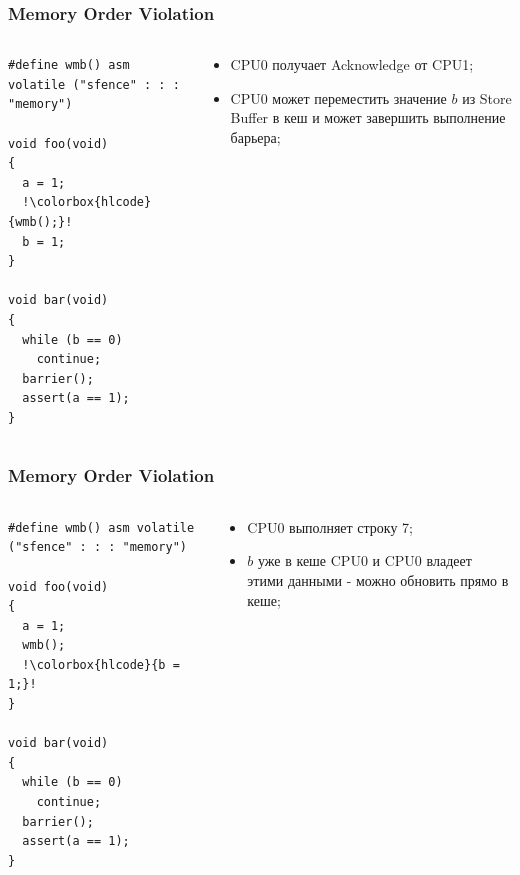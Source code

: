 \begin{frame}[fragile]
\frametitle{Memory Order Violation}

\begin{columns}[T]
  \begin{column}{.4\linewidth}
    \begin{lstlisting}[escapechar=!]
#define wmb() asm volatile ("sfence" : : : "memory")

void foo(void)
{
  a = 1;
  !\colorbox{hlcode}{wmb();}!
  b = 1;
}

void bar(void)
{
  while (b == 0)
    continue;
  barrier();
  assert(a == 1);
}
    \end{lstlisting}
  \end{column}
  \begin{column}{.6\linewidth}
    \begin{itemize}
      \item CPU0 получает Acknowledge от CPU1;
      \item CPU0 может переместить значение $b$ из Store Buffer в кеш и может
            завершить выполнение барьера;
    \end{itemize}
  \end{column}
\end{columns}
\end{frame}

\begin{frame}[fragile]
\frametitle{Memory Order Violation}

\begin{columns}[T]
  \begin{column}{.4\linewidth}
    \begin{lstlisting}[escapechar=!]
#define wmb() asm volatile ("sfence" : : : "memory")

void foo(void)
{
  a = 1;
  wmb();
  !\colorbox{hlcode}{b = 1;}!
}

void bar(void)
{
  while (b == 0)
    continue;
  barrier();
  assert(a == 1);
}
    \end{lstlisting}
  \end{column}
  \begin{column}{.6\linewidth}
    \begin{itemize}
      \item CPU0 выполняет строку 7;
      \item $b$ уже в кеше CPU0 и CPU0 владеет этими данными - можно обновить
            прямо в кеше;
    \end{itemize}
  \end{column}
\end{columns}
\end{frame}

